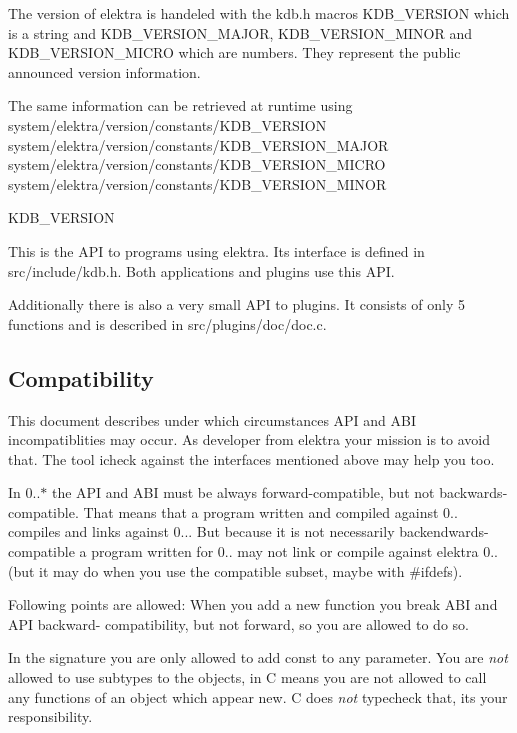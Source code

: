 The version of elektra is handeled with the kdb.\+h macros K\+D\+B\+\_\+\+V\+E\+R\+S\+I\+O\+N which is a string and K\+D\+B\+\_\+\+V\+E\+R\+S\+I\+O\+N\+\_\+\+M\+A\+J\+O\+R, K\+D\+B\+\_\+\+V\+E\+R\+S\+I\+O\+N\+\_\+\+M\+I\+N\+O\+R and K\+D\+B\+\_\+\+V\+E\+R\+S\+I\+O\+N\+\_\+\+M\+I\+C\+R\+O which are numbers. They represent the public announced version information.

The same information can be retrieved at runtime using system/elektra/version/constants/\+K\+D\+B\+\_\+\+V\+E\+R\+S\+I\+O\+N system/elektra/version/constants/\+K\+D\+B\+\_\+\+V\+E\+R\+S\+I\+O\+N\+\_\+\+M\+A\+J\+O\+R system/elektra/version/constants/\+K\+D\+B\+\_\+\+V\+E\+R\+S\+I\+O\+N\+\_\+\+M\+I\+C\+R\+O system/elektra/version/constants/\+K\+D\+B\+\_\+\+V\+E\+R\+S\+I\+O\+N\+\_\+\+M\+I\+N\+O\+R

K\+D\+B\+\_\+\+V\+E\+R\+S\+I\+O\+N

This is the A\+P\+I to programs using elektra. Its interface is defined in src/include/kdb.\+h. Both applications and plugins use this A\+P\+I.

Additionally there is also a very small A\+P\+I to plugins. It consists of only 5 functions and is described in src/plugins/doc/doc.\+c.

\subsection*{Compatibility}

This document describes under which circumstances A\+P\+I and A\+B\+I incompatiblities may occur. As developer from elektra your mission is to avoid that. The tool icheck against the interfaces mentioned above may help you too.

In 0..$\ast$ the A\+P\+I and A\+B\+I must be always forward-\/compatible, but not backwards-\/compatible. That means that a program written and compiled against 0.. compiles and links against 0... But because it is not necessarily backendwards-\/compatible a program written for 0.. may not link or compile against elektra 0.. (but it may do when you use the compatible subset, maybe with \#ifdefs).

Following points are allowed\+: When you add a new function you break A\+B\+I and A\+P\+I backward-\/ compatibility, but not forward, so you are allowed to do so.

In the signature you are only allowed to add const to any parameter. You are {\itshape not} allowed to use subtypes to the objects, in C means you are not allowed to call any functions of an object which appear new. C does {\itshape not} typecheck that, its your responsibility.

